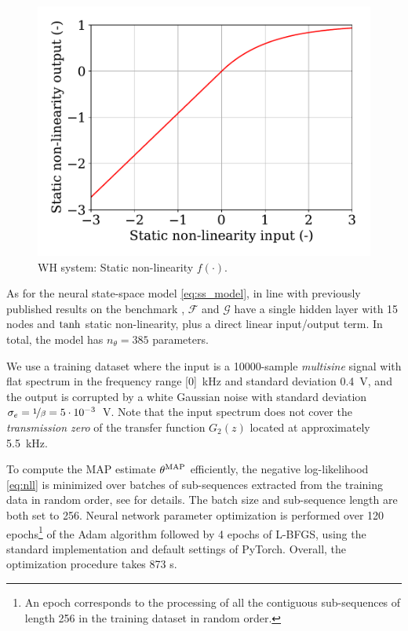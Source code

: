 \documentclass{article}
\newcommand{\MAP}{{\rm MAP}}
\begin{document}
\begin{figure}
 \centering
 \includegraphics[width=.7\linewidth]{img/wh_static.pdf}
 \caption{WH system: Static non-linearity $f(\cdot)$.}
 \label{fig:wh_static}
\end{figure}

As for the neural state-space model \eqref{eq:ss_model}, in line with previously published results on the benchmark \citep{beintema2021nonlinear}, $\mathcal{F}$ and $\mathcal{G}$ have a single hidden layer with 15 nodes and $\rm tanh$ static non-linearity, plus a direct linear input/output term. In total, the model has $n_\theta=385$ parameters.

We use a training dataset where the input is a 10000-sample \emph{multisine} signal with flat spectrum 
in the frequency range [0]~kHz and standard deviation 0.4~V, and the output is corrupted by a white Gaussian noise with standard deviation $\sigma_e=\nicefrac{1}{\beta}=5 \cdot 10^{-3}$~V. Note that the input spectrum does not cover the \emph{transmission zero} of the transfer function $G_2(z)$ located at approximately 5.5~kHz.

To compute the MAP estimate $\theta^\MAP$ efficiently, the negative log-likelihood \eqref{eq:nll} is minimized over batches of sub-sequences extracted from the training data in random order, see \citet{forgione2020model} for details. The batch size and sub-sequence length are both set to 256. 
Neural network parameter optimization is performed over 120 epochs\footnote{An epoch corresponds to the processing of all the contiguous sub-sequences of length 256 in the training dataset in random order.} of the Adam algorithm followed by 4 epochs of L-BFGS, using the standard implementation and default settings of PyTorch. Overall, the optimization procedure takes 873 s.
\end{document}
